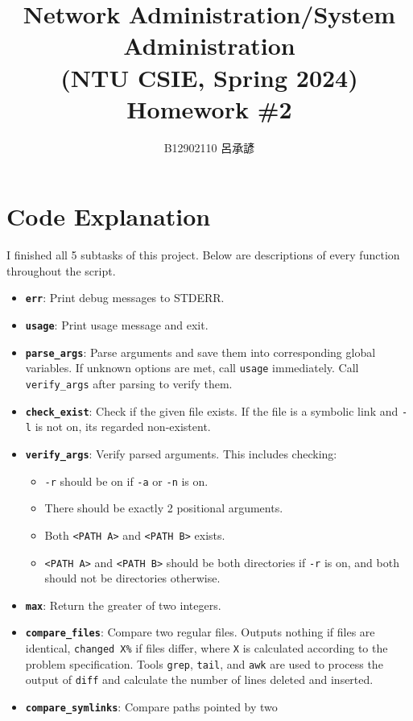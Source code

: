 \documentclass[12pt, a4paper]{article}
\title{
  Network Administration/System Administration\\
  (NTU CSIE, Spring 2024)\\
  Homework \#2
}
\author{\Large B12902110 呂承諺}
\begin{document}
  \maketitle
  \section*{Code Explanation}
  I finished all 5 subtasks of this project. Below are descriptions of
  every function throughout the script.
  \begin{itemize}
    \item \textbf{\texttt{err}}: Print debug messages to STDERR.
    \item \textbf{\texttt{usage}}: Print usage message and exit.
    \item \textbf{\texttt{parse\_args}}: Parse arguments and save them into
      corresponding global variables. If unknown options are met, call
      \texttt{usage} immediately. Call \verb|verify_args| after parsing to
      verify them.
    \item \textbf{\texttt{check\_exist}}: Check if the given file exists. If the
      file is a symbolic link and \texttt{-l} is not on, its regarded
      non-existent.
    \item \textbf{\texttt{verify\_args}}: Verify parsed arguments. This includes
      checking:
      \begin{itemize}
        \item \texttt{-r} should be on if \texttt{-a} or \texttt{-n} is on.
        \item There should be exactly 2 positional arguments.
        \item Both \texttt{<PATH A>} and \texttt{<PATH B>} exists.
        \item \texttt{<PATH A>} and \texttt{<PATH B>} should be both directories
          if \texttt{-r} is on, and both should not be directories otherwise.
      \end{itemize}
    \item \textbf{\texttt{max}}: Return the greater of two integers.
    \item \textbf{\texttt{compare\_files}}: Compare two regular files. Outputs
      nothing if files are identical, \texttt{changed X\%} if files differ, where
      \texttt{X} is calculated according to the problem specification. Tools
      \texttt{grep}, \texttt{tail}, and \texttt{awk} are used to process the
      output of \texttt{diff} and calculate the number of lines deleted and
      inserted.
    \item \textbf{\texttt{compare\_symlinks}}: Compare paths pointed by two

\end{itemize}
\end{document}
